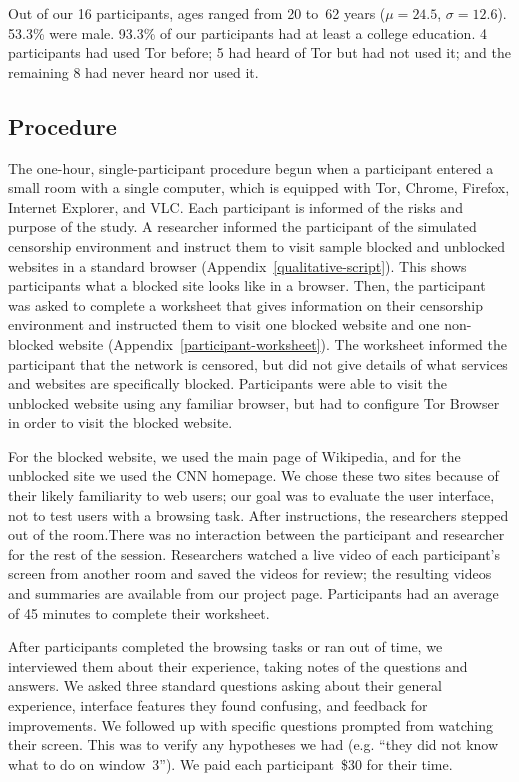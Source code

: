 \documentclass[USenglish,oneside,twocolumn]{article}
\begin{document}
Out of our 16 participants, ages ranged from 20 to~62 years
($\mu = 24.5$, $\sigma = 12.6$). 53.3\% were male. 
93.3\% of our participants had at least
a college education.
4 participants had used Tor before;
5 had heard of Tor but had not used it;
and the remaining 8 had never heard nor used it.


\subsection{Procedure}
The one-hour, single-participant procedure begun when a participant entered a small 
room with a single computer, which is equipped with Tor, Chrome, Firefox, Internet Explorer, and VLC.
Each participant is informed of the risks and purpose of the study.
A researcher informed the participant of the simulated censorship environment and
instruct them to visit sample blocked and unblocked websites
in a standard browser (Appendix~\ref{qualitative-script}). 
This shows participants what a blocked site looks like in a browser. 
Then, the participant was asked to complete a worksheet that gives information
on their censorship environment and instructed them
to visit one blocked website and one non-blocked website (Appendix~\ref{participant-worksheet}).
The worksheet informed the participant that the network is censored,
but did not give details of what services and websites are specifically blocked.
Participants were able to visit the unblocked website using any familiar browser,
but had to configure Tor Browser in order to visit the blocked website.
 
For the blocked website, we used the main page of Wikipedia,
and for the unblocked site we used the CNN homepage.
We chose these two sites because of their likely familiarity to web users;
our goal was to evaluate the user interface, not to test users with a browsing task.
After instructions, the researchers stepped out of the room.There was no interaction
between the participant and researcher for the rest of the session.
Researchers watched a live video of each participant's screen from another room
and saved the videos for review; the resulting videos and summaries
are available from our project page.
Participants had an average of 45 minutes to complete their worksheet. 

After participants completed the browsing tasks or ran out of time,
we interviewed them about their experience,
taking notes of the questions and answers.
We asked three standard questions asking about their general experience, 
interface features they found confusing, and feedback for improvements. We followed up
with specific questions prompted from watching their screen. 
This was to verify any hypotheses we had (e.g. ``they did not know what to do on window~3'').
We paid each participant~\$30 for their time. 
\end{document}
